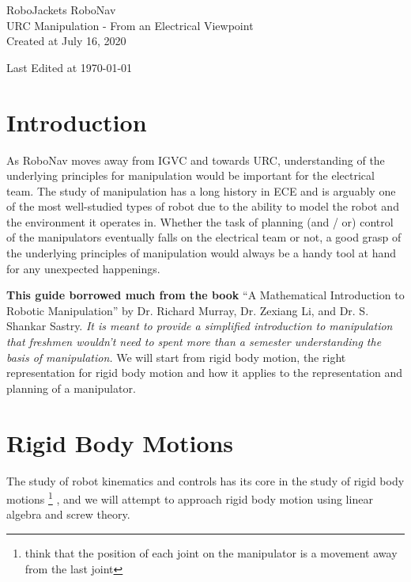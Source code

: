 \documentclass[letterpaper]{article}
\begin{document}
\begin{titlepage}
\centering
	{\LARGE RoboJackets RoboNav}\\
	\vspace{1cm}
	{\Large URC Manipulation - From an Electrical Viewpoint}\\
	\vfill
	{\large Created at July 16, 2020}\\
	\vspace{1cm}
	{\large Last Edited at \today\par}
\end{titlepage}
\pagebreak

\tableofcontents

\pagebreak

\section{Introduction}
As RoboNav moves away from IGVC and towards URC, understanding of the underlying principles for manipulation 
would be important for the electrical team. The study of manipulation has a long history in ECE and is arguably
one of the most well-studied types of robot due to the ability to model the robot and the environment it operates
in. Whether the task of planning (and / or) control of the manipulators eventually falls on the electrical team
or not, a good grasp of the underlying principles of manipulation would always be a handy tool at hand for any
unexpected happenings. 

\textbf{This guide borrowed much from the book} ``A Mathematical Introduction to Robotic Manipulation'' by
Dr. Richard Murray, Dr. Zexiang Li, and Dr. S. Shankar Sastry. \emph{It is meant to provide a simplified introduction
to manipulation that freshmen wouldn't need to spent more than a semester understanding the basis
of manipulation.} We will start from rigid body motion, the right representation for rigid body motion and how it
applies to the representation and planning of a manipulator.

\section{Rigid Body Motions} \label{sec:rbm}
The study of robot kinematics and controls has its core in the study of rigid body motions
\footnote{think that the position of each joint on the manipulator is a movement away from the last joint}
, and we will attempt to approach rigid body motion using linear algebra and screw theory.
\end{document}

